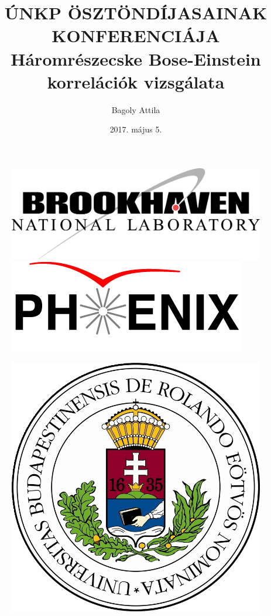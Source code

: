 \documentclass{beamer}
\title[Háromrészecske BE korrelációk vizsgálata]{ ÚNKP ÖSZTÖNDÍJASAINAK KONFERENCIÁJA \vspace{0.4cm}\\ Háromrészecske Bose-Einstein korrelációk vizsgálata}
\author[Bagoly Attila]{\Large{ Bagoly Attila}\\ \vspace{0.1cm}}
\date[2017. május 5.]{2017. május 5.}
\institute[ELTE TTK]{
\large{Témavezető: Csanád Máté}
}
\begin{document}
\begin{frame}
\vspace*{-20pt}
\begin{figure}
\includegraphics[scale=0.1]{pic/BNL2}
\hspace*{90pt}
\includegraphics[scale=0.25]{pic/phenix}
\end{figure}
\vspace*{-30pt}
  \titlepage
\vspace*{-27pt}
\begin{figure}
\includegraphics[scale=0.05]{pic/ELTE}
\end{figure}

\end{frame}
\end{document}
